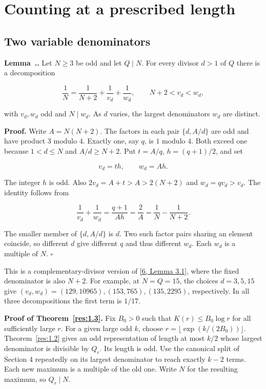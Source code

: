 \documentclass[11pt,a4paper]{article}
\newcounter{result}[section]
\renewcommand{\theresult}{\thesection.\arabic{result}}
\newcommand{\paperstatement}[3]{%
  \refstepcounter{result}\label{res:#2}%
  \noindent\textbf{#1~\theresult#3.}\enspace\ignorespaces}
\begin{document}
\section{Counting at a prescribed length}

\subsection{Two variable denominators}

\paperstatement{Lemma}{5.1}{} Let $N\ge3$ be odd and let $Q\mid N$. For every divisor $d>1$ of $Q$ there is a decomposition

\[
\frac1N=\frac1{N+2}+\frac1{v_d}+\frac1{w_d},\qquad N+2<v_d<w_d,
\]

with $v_d,w_d$ odd and $N\mid w_d$. As $d$ varies, the largest denominators $w_d$ are distinct.

\textbf{Proof.} Write $A=N(N+2)$. The factors in each pair $\{d,A/d\}$ are odd and have product $3$ modulo $4$. Exactly one, say $q$, is $1$ modulo $4$. Both exceed one because $1<d\le N$ and $A/d\ge N+2$. Put $t=A/q$, $h=(q+1)/2$, and set

\[
v_d=th,\qquad w_d=Ah.
\]

The integer $h$ is odd. Also $2v_d=A+t>A>2(N+2)$ and $w_d=qv_d>v_d$. The identity follows from

\[
\frac{1}{v_d}+\frac{1}{w_d}=\frac{q+1}{Ah}=\frac2A=\frac1N-\frac1{N+2}.
\]

The smaller member of $\{d,A/d\}$ is $d$. Two such factor pairs sharing an element coincide, so different $d$ give different $q$ and thus different $w_d$. Each $w_d$ is a multiple of $N$. $\square$

This is a complementary-divisor version of \hyperlink{ref-6}{[6, Lemma 3.1]}, where the fixed denominator is also $N+2$. For example, at $N=Q=15$, the choices $d=3,5,15$ give $(v_d,w_d)=(129,10965),(153,765),(135,2295)$, respectively. In all three decompositions the first term is $1/17$.

\textbf{Proof of Theorem~\ref{res:1.3}.} Fix $B_0>0$ such that $K(r)\le B_0\log r$ for all sufficiently large $r$. For a given large odd $k$, choose $r=\lfloor\exp(k/(2B_0))\rfloor$. Theorem~\ref{res:1.2} gives an odd representation of length at most $k/2$ whose largest denominator is divisible by $Q_r$. Its length is odd. Use the canonical split of Section 4 repeatedly on its largest denominator to reach exactly $k-2$ terms. Each new maximum is a multiple of the old one. Write $N$ for the resulting maximum, so $Q_r\mid N$.
\end{document}
